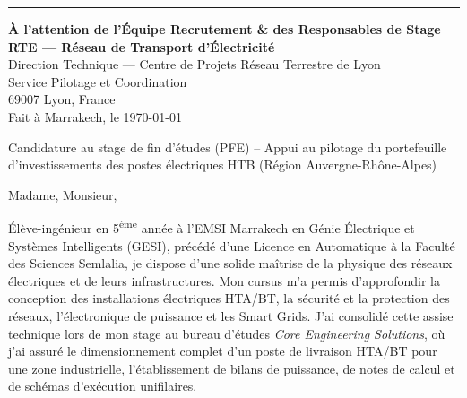 \documentclass[10pt,a4paper]{altacv}
\makeatletter
\renewcommand{\makecvheader}{%
  \begingroup
    \raggedright\color{emphasis}%
    {\LARGE\bfseries\MakeUppercase{\@name}\par}\vspace{2pt}
    {\normalsize\bfseries\color{accent}\@tagline\par}\vspace{4pt}
    {\footnotesize\color{emphasis}\@personalinfo\par}
  \endgroup\vspace{6pt}
  {\color{heading}\rule{\linewidth}{1.2pt}}\par\vspace{8pt}
}
\makeatother
\begin{document}

\makecvheader

\begin{flushright}
  {\color{emphasis}\textbf{À l'attention de l'Équipe Recrutement \& des Responsables de Stage}} \\[2pt]
  \textbf{RTE — Réseau de Transport d’Électricité} \\
  Direction Technique — Centre de Projets Réseau Terrestre de Lyon \\
  Service Pilotage et Coordination \\
  69007 Lyon, France \\[8pt]
  Fait à Marrakech, le \today
\end{flushright}
\vspace{4pt}

 Candidature au stage de fin d'études (PFE) -- Appui au pilotage du portefeuille d'investissements des postes électriques HTB (Région Auvergne-Rhône-Alpes)

\vspace{8pt}

\noindent Madame, Monsieur,

\vspace{5pt}

Élève-ingénieur en 5\textsuperscript{ème} année à l'EMSI Marrakech en Génie Électrique et Systèmes Intelligents (GESI), précédé d'une Licence en Automatique à la Faculté des Sciences Semlalia, je dispose d'une solide maîtrise de la physique des réseaux électriques et de leurs infrastructures. Mon cursus m'a permis d'approfondir la conception des installations électriques HTA/BT, la sécurité et la protection des réseaux, l'électronique de puissance et les Smart Grids. J'ai consolidé cette assise technique lors de mon stage au bureau d'études \textit{Core Engineering Solutions}, où j'ai assuré le dimensionnement complet d'un poste de livraison HTA/BT pour une zone industrielle, l'établissement de bilans de puissance, de notes de calcul et de schémas d'exécution unifilaires.
\end{document}
